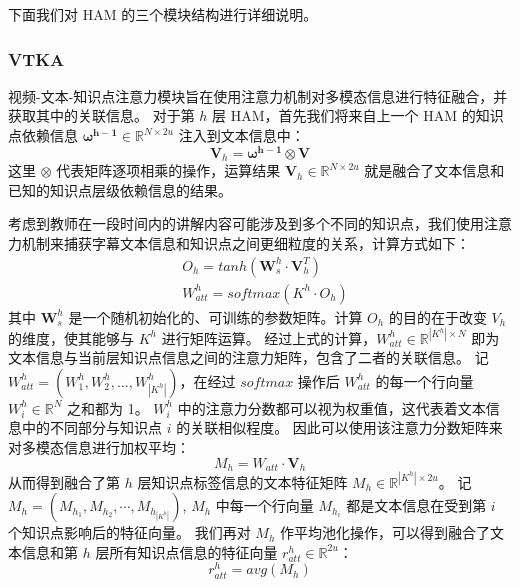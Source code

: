     下面我们对 HAM 的三个模块结构进行详细说明。

    \subsubsection{VTKA}
    视频-文本-知识点注意力模块旨在使用注意力机制对多模态信息进行特征融合，并获取其中的关联信息。
    对于第 $h$ 层 HAM，首先我们将来自上一个 HAM 的知识点依赖信息 $\boldsymbol{\omega^{h - 1}} \in \mathbb{R}^{N \times 2u}$ 注入到文本信息中：
    \begin{equation}
        \boldsymbol{V}_h = \boldsymbol{\omega^{h - 1}} \otimes \boldsymbol{V}
    \end{equation}
    这里 $\otimes$ 代表矩阵逐项相乘的操作，运算结果 $\boldsymbol{V}_h \in \mathbb{R}^{N \times 2u}$ 就是融合了文本信息和已知的知识点层级依赖信息的结果。

    考虑到教师在一段时间内的讲解内容可能涉及到多个不同的知识点，我们使用注意力机制来捕获字幕文本信息和知识点之间更细粒度的关系，计算方式如下：
    \begin{equation}
        \begin{aligned}
            &O_h = tanh\left(\boldsymbol{W}_s^h \cdot \boldsymbol{V}_h^T\right) \\
            &W_{att}^h = softmax\left(K^h \cdot O_h\right)
        \end{aligned}
    \end{equation}
    其中 $\boldsymbol{W}_s^h$ 是一个随机初始化的、可训练的参数矩阵。计算 $O_h$ 的目的在于改变 $V_h$ 的维度，使其能够与 $K^h$ 进行矩阵运算。
    经过上式的计算，$W_{att}^h \in \mathbb{R}^{\left|K^h\right| \times N}$ 即为文本信息与当前层知识点信息之间的注意力矩阵，包含了二者的关联信息。
    记 $W_{att}^h = \left(W_1^h, W_2^h, \dots, W_{\left|K^h\right|}^h\right)$，在经过 $softmax$ 操作后 $W_{att}^h$ 的每一个行向量 $W_i^h \in \mathbb{R}^N$ 之和都为 1。
    $W_i^h$ 中的注意力分数都可以视为权重值，这代表着文本信息中的不同部分与知识点 $i$ 的关联相似程度。
    因此可以使用该注意力分数矩阵来对多模态信息进行加权平均：
    \begin{equation}
        M_h = W_{att} \cdot \boldsymbol{V}_h
    \end{equation}
    从而得到融合了第 $h$ 层知识点标签信息的文本特征矩阵 $M_h \in \mathbb{R}^{{\left|K^h\right|} \times 2u}$。
    记 $M_h = \left(M_{h_1}, M_{h_2}, \cdots, M_{h_{\left|K^h\right|}}\right)$, $M_h$ 中每一个行向量 $M_{h_i}$ 都是文本信息在受到第 $i$ 个知识点影响后的特征向量。
    我们再对 $M_h$ 作平均池化操作，可以得到融合了文本信息和第 $h$ 层所有知识点信息的特征向量 $r_{att}^h \in \mathbb{R}^{2u}$：
    \begin{equation}
        r_{att}^h = avg\left(M_h\right)
    \end{equation}

